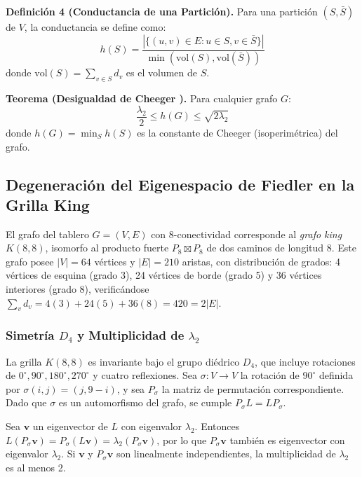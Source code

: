 \documentclass[conference]{IEEEtran}
\begin{document}
\textbf{Definición 4 (Conductancia de una Partición).} Para una partición $(S, \bar{S})$ de $V$, la conductancia se define como:
\begin{equation}
h(S) = \frac{|\{(u,v) \in E : u \in S, v \in \bar{S}\}|}{\min(\text{vol}(S), \text{vol}(\bar{S}))}
\end{equation}
donde $\text{vol}(S) = \sum_{v \in S} d_v$ es el volumen de $S$.

\textbf{Teorema (Desigualdad de Cheeger \cite{chung1997}).} Para cualquier grafo $G$:
\begin{equation}
\frac{\lambda_2}{2} \leq h(G) \leq \sqrt{2\lambda_2}
\end{equation}
donde $h(G) = \min_S h(S)$ es la constante de Cheeger (isoperimétrica) del grafo.

\subsection{Degeneración del Eigenespacio de Fiedler en la Grilla King}

El grafo del tablero $G = (V, E)$ con 8-conectividad corresponde al \textit{grafo king} $K(8,8)$, isomorfo al producto fuerte $P_8 \boxtimes P_8$ de dos caminos de longitud 8. Este grafo posee $|V| = 64$ vértices y $|E| = 210$ aristas, con distribución de grados: 4 vértices de esquina (grado 3), 24 vértices de borde (grado 5) y 36 vértices interiores (grado 8), verificándose $\sum_{v} d_v = 4(3) + 24(5) + 36(8) = 420 = 2|E|$.

\subsubsection{Simetría $D_4$ y Multiplicidad de $\lambda_2$}

La grilla $K(8,8)$ es invariante bajo el grupo diédrico $D_4$, que incluye rotaciones de $0^\circ, 90^\circ, 180^\circ, 270^\circ$ y cuatro reflexiones. Sea $\sigma: V \to V$ la rotación de $90^\circ$ definida por $\sigma(i,j) = (j, 9-i)$, y sea $P_\sigma$ la matriz de permutación correspondiente. Dado que $\sigma$ es un automorfismo del grafo, se cumple $P_\sigma L = L P_\sigma$.

Sea $\mathbf{v}$ un eigenvector de $L$ con eigenvalor $\lambda_2$. Entonces $L(P_\sigma \mathbf{v}) = P_\sigma (L\mathbf{v}) = \lambda_2 (P_\sigma \mathbf{v})$, por lo que $P_\sigma \mathbf{v}$ también es eigenvector con eigenvalor $\lambda_2$. Si $\mathbf{v}$ y $P_\sigma \mathbf{v}$ son linealmente independientes, la multiplicidad de $\lambda_2$ es al menos 2.
\end{document}
